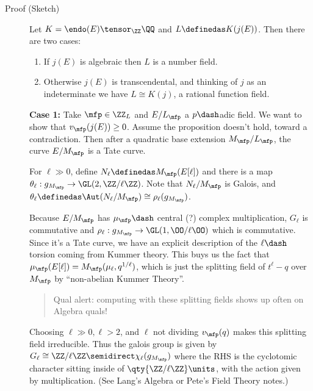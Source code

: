 \begin{description}
\item[Proof (Sketch)]
Let \(K = \endo(E) \tensor_\ZZ \QQ\) and \(L\definedas K(j(E))\). Then
there are two cases:

\begin{enumerate}
\def\labelenumi{\arabic{enumi}.}
\tightlist
\item
  If \(j(E)\) is algebraic then \(L\) is a number field.
\item
  Otherwise \(j(E)\) is transcendental, and thinking of \(j\) as an
  indeterminate we have \(L \cong K(j)\), a rational function field.
\end{enumerate}

\textbf{Case 1:} Take \(\mfp \in \ZZ_L\) and \(E/L_\mfp\) a
\(p\dash\)adic field. We want to show that \(v_\mfp (j(E)) \geq 0\).
Assume the proposition doesn't hold, toward a contradiction. Then after
a quadratic base extension \(M_\mfp / L_\mfp\), the curve \(E/M_\mfp\)
is a Tate curve.

\hfill\break

For \(\ell \gg 0\), define \(N_\ell \definedas M_\mfp (E[\ell])\) and
there is a map \(\theta_\ell: g_{M_\mfp} \to \GL(2, \ZZ/\ell\ZZ)\). Note
that \(N_\ell / M_\mfp\) is Galois, and
\(\theta_\ell \definedas \Aut(N_\ell / M_\mfp) \cong \rho_\ell(g_{M_\mfp})\).

\hfill\break

Because \(E / M_\mfp\) has \(\mu_\mfp\dash\) central (?) complex
multiplication, \(G_\ell\) is commutative and
\(\rho_\ell: g_{M_\mfp} \to \GL(1, \OO/\ell\OO)\) which is commutative.
Since it's a Tate curve, we have an explicit description of the
\(\ell\dash\)torsion coming from Kummer theory. This buys us the fact
that \(\mu_\mfp(E[\ell]) = M_\mfp(\mu_\ell, q^{1/\ell})\), which is just
the splitting field of \(t^\ell - q\) over \(M_\mfp\) by ``non-abelian
Kummer Theory''.

\begin{quote}
Qual alert: computing with these splitting fields shows up often on
Algebra quals!
\end{quote}

Choosing \(\ell \gg 0, \ell > 2\), and \(\ell\) not dividing
\(v_\mfp(q)\) makes this splitting field irreducible. Thus the galois
group is given by
\(G_\ell \cong \ZZ/\ell \ZZ \semidirect \chi_\ell(g_{M_\mfp})\) where
the RHS is the cyclotomic character sitting inside of
\(\qty{\ZZ/\ell\ZZ}\units\), with the action given by multiplication.
(See Lang's Algebra or Pete's Field Theory notes.)


\end{description}
